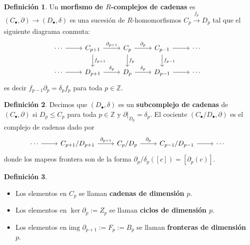 \documentclass{book}
\theoremstyle{definition}
\newtheorem*{defn}{Definición}
\begin{document}
	\begin{defn}
		Un \textbf{morfismo de $R$-complejos de cadenas} es $(C_\bullet{},\partial)\to(D_\bullet{},\delta)$ es una sucesión de $R$-homomorfismos $C_p\xrightarrow[]{f_p} D_p$ tal que el siguiente diagrama conmuta:
		\[
		\begin{tikzcd}
			\cdots \arrow{r} & C_{p+1} \arrow{r}{\partial_{p+1}} \arrow{d}{f_{p+1}} & C_p \arrow{r}{\partial_p} \arrow{d}{f_p} & C_{p-1} \arrow{r} \arrow{d}{f_{p-1}} & \cdots \\
			\cdots \arrow{r} & D_{p+1} \arrow{r}{\delta_p} & D_p \arrow{r}{\delta_p} & D_{p-1} \arrow{r} & \cdots
		\end{tikzcd}
		\]
		es decir $f_{p-1}\partial_p=\delta_pf_p$ para toda $p\in\mathbb{Z}$.
	\end{defn}
	\begin{defn}
		Decimos que $(D_\bullet,\delta)$ es un \textbf{subcomplejo de cadenas} de $(C_\bullet,\partial)$ si $D_p\leq C_p$ para toda $p\in\mathbb Z$ y $\partial|_{D_p}=\delta_p$. El cociente $(C_\bullet/D_\bullet,\partial)$ es el complejo de cadenas dado por
		\[
		\begin{tikzcd}
			\cdots \arrow{r} & C_{p+1}/D_{p+1} \arrow{r}{\partial_{p+1}} & C_{p}/D_{p} \arrow{r}{\partial_{p}} & C_{p-1}/D_{p-1} \arrow{r} & \cdots
		\end{tikzcd}
		\]
		donde los mapeos frontera son de la forma $\partial_p/\delta_p([c])=[\partial_p(c)]$.
	\end{defn}
	\begin{defn}\leavevmode
		\begin{itemize}
			\item Los elementos en $C_p$ se llaman \textbf{cadenas de dimensión $p$}.
			\item Los elementos en $\ker\partial_p:=Z_p$ se llaman \textbf{ciclos de dimensión $p$}.
			\item Los elementos en $\text{img }\partial_{p+1}:=F_p:=B_p$ se llaman \textbf{fronteras de dimensión $p$}.
		\end{itemize}
	\end{defn}
	
\end{document}
